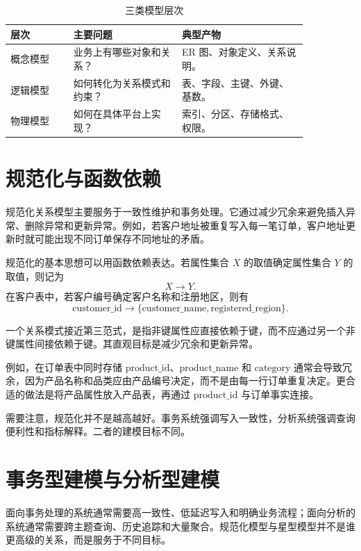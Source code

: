 \documentclass[UTF8,fontset=fandol,openany,zihao=-4]{ctexbook}
\begin{document}
\begin{table}[htbp]
\centering
\caption{三类模型层次}
\begin{tabular}{p{0.18\linewidth}p{0.31\linewidth}p{0.36\linewidth}}
\toprule
层次 & 主要问题 & 典型产物\\
\midrule
概念模型 & 业务上有哪些对象和关系？ & ER 图、对象定义、关系说明。\\
逻辑模型 & 如何转化为关系模式和约束？ & 表、字段、主键、外键、基数。\\
物理模型 & 如何在具体平台上实现？ & 索引、分区、存储格式、权限。\\
\bottomrule
\end{tabular}
\end{table}

\section{规范化与函数依赖}

规范化关系模型主要服务于一致性维护和事务处理。它通过减少冗余来避免插入异常、删除异常和更新异常。例如，若客户地址被重复写入每一笔订单，客户地址更新时就可能出现不同订单保存不同地址的矛盾。

规范化的基本思想可以用函数依赖表达。若属性集合 \(X\) 的取值确定属性集合 \(Y\) 的取值，则记为
\[
X\rightarrow Y.
\]
在客户表中，若客户编号确定客户名称和注册地区，则有
\[
\text{customer\_id}\rightarrow
\{\text{customer\_name},\text{registered\_region}\}.
\]

\begin{definition}[第三范式的直观要求]
一个关系模式接近第三范式，是指非键属性应直接依赖于键，而不应通过另一个非键属性间接依赖于键。其直观目标是减少冗余和更新异常。
\end{definition}

例如，在订单表中同时存储 \(\text{product\_id}\)、\(\text{product\_name}\) 和 \(\text{category}\) 通常会导致冗余，因为产品名称和品类应由产品编号决定，而不是由每一行订单重复决定。更合适的做法是将产品属性放入产品表，再通过 \(\text{product\_id}\) 与订单事实连接。

需要注意，规范化并不是越高越好。事务系统强调写入一致性，分析系统强调查询便利性和指标解释。二者的建模目标不同。

\section{事务型建模与分析型建模}

面向事务处理的系统通常需要高一致性、低延迟写入和明确业务流程；面向分析的系统通常需要跨主题查询、历史追踪和大量聚合。规范化模型与星型模型并不是谁更高级的关系，而是服务于不同目标。
\end{document}
